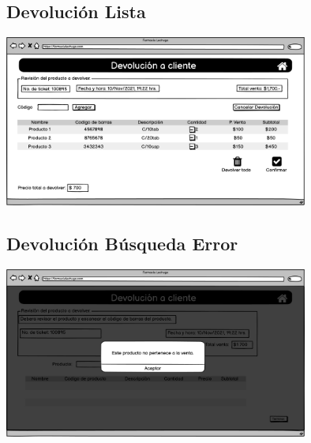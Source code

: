 \begin{flushleft}
	\subsection{Devolución Lista} \label{UI: devolucion lista}
	\begin{center}
		\includegraphics[width=10cm]{pantallas/images/21devolucionlista.png}\\	
		 	
	\end{center}
	\subsection{Devolución Búsqueda Error} \label{UI: devolucion busqueda error}
	\begin{center}
		\includegraphics[width=10cm]{pantallas/images/22devolucionbusquedaerror.png}\\	
		 	
	\end{center}

\end{flushleft}
